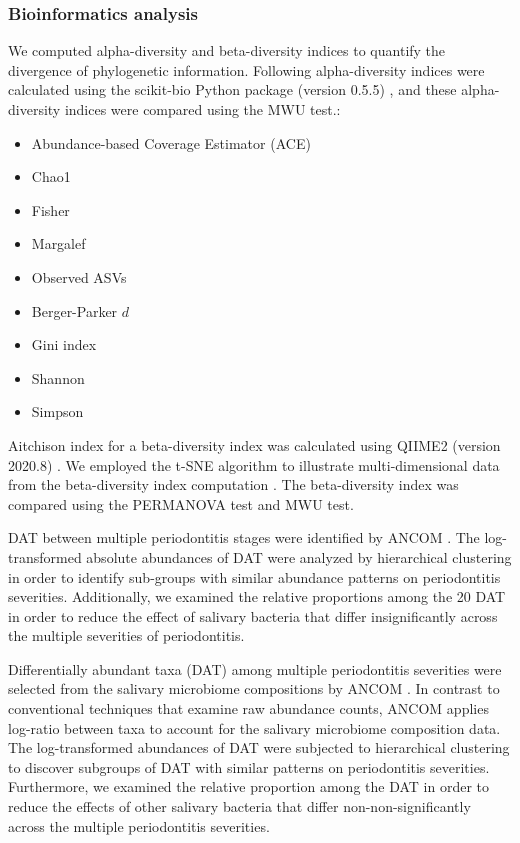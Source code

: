 \documentclass[11pt, a4paper, onecolumn, oneside]{report}
\begin{document}
            \subsubsection{Bioinformatics analysis}
                We computed alpha-diversity and beta-diversity indices to quantify the divergence of phylogenetic information. Following alpha-diversity indices were calculated using the scikit-bio Python package (version 0.5.5) \cite{scikit-bio-1}, and these alpha-diversity indices were compared using the MWU test.:
                \begin{itemize}
                    \item Abundance-based Coverage Estimator (ACE) \cite{ACE-1}
                    \item Chao1 \cite{chao1-1}
                    \item Fisher \cite{fisher-1}
                    \item Margalef \cite{margalef-1}
                    \item Observed ASVs \cite{observed-ASVs-1}
                    \item Berger-Parker $d$ \cite{Berger-1}
                    \item Gini index \cite{Gini-1}
                    \item Shannon \cite{Shannon-1}
                    \item Simpson \cite{Simpson-1}
                \end{itemize}

                Aitchison index for a beta-diversity index was calculated using QIIME2 (version 2020.8) \cite{Aitchison-1, QIIME2-1}. We employed the t-SNE algorithm to illustrate multi-dimensional data from the beta-diversity index computation \cite{tSNE-1}. The beta-diversity index was compared using the PERMANOVA test \cite{PERMANOVA-1, PERMANOVA-2} and MWU test.

                DAT between multiple periodontitis stages were identified by ANCOM \cite{ANCOM-1}. The log-transformed absolute abundances of DAT were analyzed by hierarchical clustering in order to identify sub-groups with similar abundance patterns on periodontitis severities. Additionally, we examined the relative proportions among the 20 DAT in order to reduce the effect of salivary bacteria that differ insignificantly across the multiple severities of periodontitis.

                Differentially abundant taxa (DAT) among multiple periodontitis severities were selected from the salivary microbiome compositions by ANCOM \cite{ANCOM-1}. In contrast to conventional techniques that examine raw abundance counts, ANCOM applies log-ratio between taxa to account for the salivary microbiome composition data. The log-transformed abundances of DAT were subjected to hierarchical clustering to discover subgroups of DAT with similar patterns on periodontitis severities. Furthermore, we examined the relative proportion among the DAT in order to reduce the effects of other salivary bacteria that differ non-non-significantly across the multiple periodontitis severities.
\end{document}
